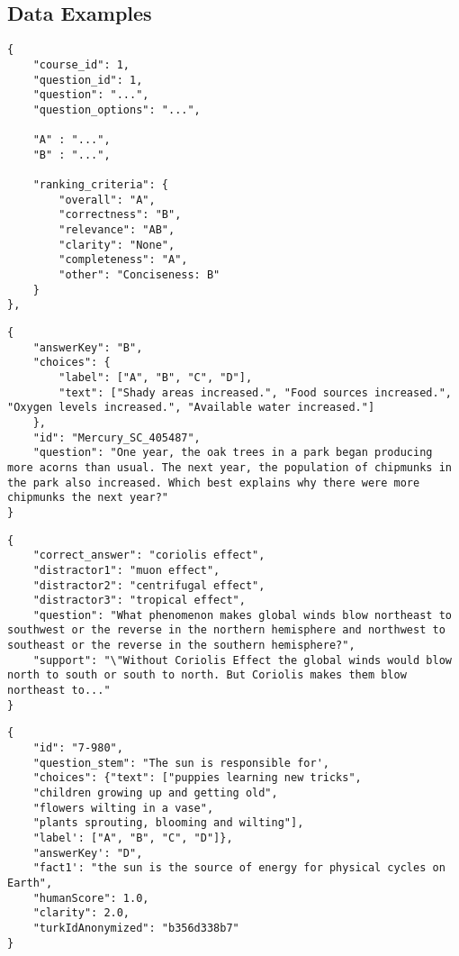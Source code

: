 




\subsection{Data Examples}
\label{subsec:data-examples}

\begin{lstlisting}[caption=EPFL Preference Data Example]
{
    "course_id": 1,
    "question_id": 1,
    "question": "...",
    "question_options": "...",

    "A" : "...",
    "B" : "...",

    "ranking_criteria": {
        "overall": "A",
        "correctness": "B", 
        "relevance": "AB",
        "clarity": "None",
        "completeness": "A",
        "other": "Conciseness: B"
    }
},
\end{lstlisting}

\begin{lstlisting}[caption=ARC Data Example]
{
    "answerKey": "B",
    "choices": {
        "label": ["A", "B", "C", "D"],
        "text": ["Shady areas increased.", "Food sources increased.", "Oxygen levels increased.", "Available water increased."]
    },
    "id": "Mercury_SC_405487",
    "question": "One year, the oak trees in a park began producing more acorns than usual. The next year, the population of chipmunks in the park also increased. Which best explains why there were more chipmunks the next year?"
}
\end{lstlisting}

\begin{lstlisting}[caption=SciQ Data Example]
{
    "correct_answer": "coriolis effect",
    "distractor1": "muon effect",
    "distractor2": "centrifugal effect",
    "distractor3": "tropical effect",
    "question": "What phenomenon makes global winds blow northeast to southwest or the reverse in the northern hemisphere and northwest to southeast or the reverse in the southern hemisphere?",
    "support": "\"Without Coriolis Effect the global winds would blow north to south or south to north. But Coriolis makes them blow northeast to..."
}
\end{lstlisting}

\begin{lstlisting}[caption=OpenBookQA Data Example]
{
    "id": "7-980",
    "question_stem": "The sun is responsible for',
    "choices": {"text": ["puppies learning new tricks",
    "children growing up and getting old",
    "flowers wilting in a vase",
    "plants sprouting, blooming and wilting"],
    "label': ["A", "B", "C", "D"]},
    "answerKey': "D",
    "fact1': "the sun is the source of energy for physical cycles on Earth",
    "humanScore": 1.0,
    "clarity": 2.0,
    "turkIdAnonymized": "b356d338b7"
}
\end{lstlisting}

